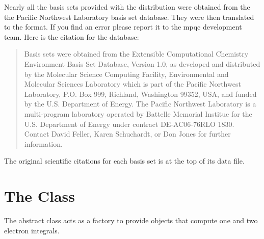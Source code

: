 Nearly all the basis sets provided with the distribution were obtained from
the the Pacific Northwest Laboratory basis set database.  They were then
translated to the  format.  If you find an error
please report it to the mpqc development team.  Here is the citation for
the database:
\begin{quote}
Basis sets were obtained from the Extensible Computational Chemistry
Environment Basis Set Database, Version 1.0, as developed and
distributed by the Molecular Science Computing Facility, Environmental
and Molecular Sciences Laboratory which is part of the Pacific
Northwest Laboratory, P.O. Box 999, Richland, Washington 99352, USA,
and funded by the U.S. Department of Energy. The Pacific Northwest
Laboratory is a multi-program laboratory operated by Battelle Memorial
Institue for the U.S. Department of Energy under contract
DE-AC06-76RLO 1830. Contact David Feller, Karen Schuchardt, or Don
Jones for further information.
\end{quote}
The original scientific citations for each basis set is at the top of its
data file.


\section{The  Class}
\label{Integral}

The  abstract class acts as a factory to provide
objects that compute one and two electron integrals.
